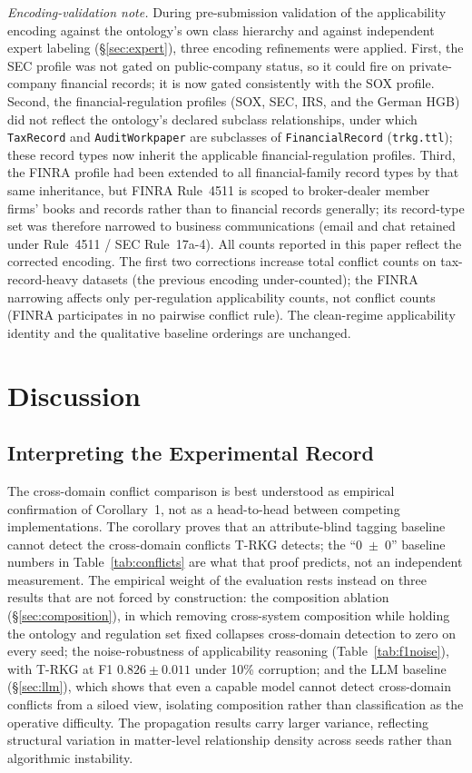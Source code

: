 \documentclass{ieeeaccess}
\begin{document}
\textit{Encoding-validation note.} During pre-submission validation of the applicability encoding against the ontology's own class hierarchy and against independent expert labeling (§\ref{sec:expert}), three encoding refinements were applied. First, the SEC profile was not gated on public-company status, so it could fire on private-company financial records; it is now gated consistently with the SOX profile. Second, the financial-regulation profiles (SOX, SEC, IRS, and the German HGB) did not reflect the ontology's declared subclass relationships, under which \texttt{TaxRecord} and \texttt{AuditWorkpaper} are subclasses of \texttt{FinancialRecord} (\texttt{trkg.ttl}); these record types now inherit the applicable financial-regulation profiles. Third, the FINRA profile had been extended to all financial-family record types by that same inheritance, but FINRA Rule~4511 is scoped to broker-dealer member firms' books and records rather than to financial records generally; its record-type set was therefore narrowed to business communications (email and chat retained under Rule~4511 / SEC Rule~17a-4). All counts reported in this paper reflect the corrected encoding. The first two corrections increase total conflict counts on tax-record-heavy datasets (the previous encoding under-counted); the FINRA narrowing affects only per-regulation applicability counts, not conflict counts (FINRA participates in no pairwise conflict rule). The clean-regime applicability identity and the qualitative baseline orderings are unchanged.

\section{Discussion}

\subsection{Interpreting the Experimental Record}

The cross-domain conflict comparison is best understood as empirical confirmation of Corollary~1, not as a head-to-head between competing implementations. The corollary proves that an attribute-blind tagging baseline cannot detect the cross-domain conflicts T-RKG detects; the ``0~$\pm$~0'' baseline numbers in Table~\ref{tab:conflicts} are what that proof predicts, not an independent measurement. The empirical weight of the evaluation rests instead on three results that are not forced by construction: the composition ablation (§\ref{sec:composition}), in which removing cross-system composition while holding the ontology and regulation set fixed collapses cross-domain detection to zero on every seed; the noise-robustness of applicability reasoning (Table~\ref{tab:f1noise}), with T-RKG at F1 $0.826 \pm 0.011$ under 10\% corruption; and the LLM baseline (§\ref{sec:llm}), which shows that even a capable model cannot detect cross-domain conflicts from a siloed view, isolating composition rather than classification as the operative difficulty. The propagation results carry larger variance, reflecting structural variation in matter-level relationship density across seeds rather than algorithmic instability.
\end{document}
